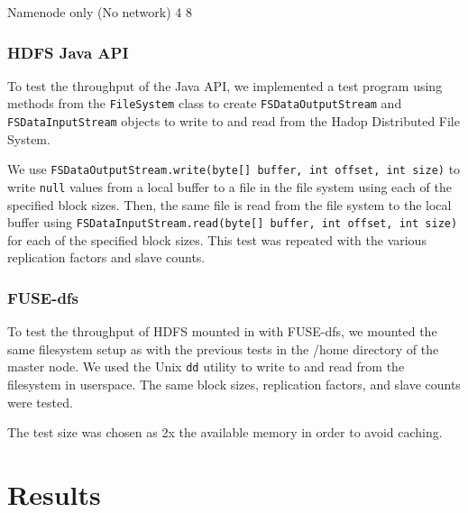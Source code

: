 \documentclass[11]{article}
\begin{document}
Namenode only (No network)
4 
8 

\subsubsection{HDFS Java API}
To test the throughput of the Java API, we implemented a test program 
using methods from the \verb|FileSystem| class to create 
\verb|FSDataOutputStream| and \verb|FSDataInputStream| objects
to write to and read from the Hadop Distributed File System. 

We use \verb|FSDataOutputStream.write(byte[] buffer, int offset, int size)| 
to write \verb|null| values from a local buffer to a file in the file 
system using each of the specified block sizes. Then, the same file is 
read from the file system to the local buffer using 
\verb|FSDataInputStream.read(byte[] buffer, int offset, int size)| for 
each of the specified block sizes. This test was repeated with the 
various replication factors and slave counts. 

\subsubsection{FUSE-dfs}
To test the throughput of HDFS mounted in with FUSE-dfs, we mounted the
same filesystem setup as with the previous tests in the /home directory
of the master node. We used the Unix \verb|dd| utility to write to and 
read from the filesystem in userspace. The same block sizes, 
replication factors, and slave counts were tested.

The test size was chosen as 2x the available memory in order to avoid 
caching. 

\subsubsection{}

\pagebreak

\section{Results}
\end{document}
